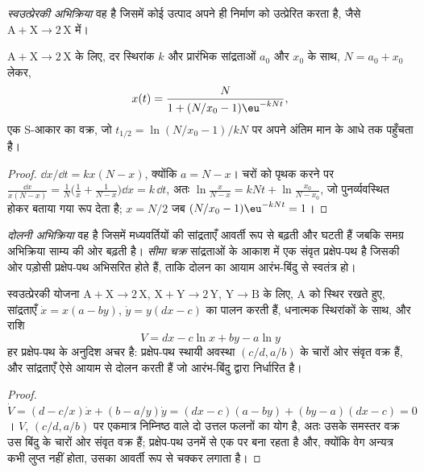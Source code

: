 \begin{definition}[स्वउत्प्रेरकी अभिक्रिया]\label{def:b3:complex-kinetics:autocatalysis}
\emph{स्वउत्प्रेरकी अभिक्रिया} वह है जिसमें कोई
उत्पाद अपने ही निर्माण को उत्प्रेरित करता है, जैसे $\mathrm{A + X \to 2\,X}$ में।
\end{definition}

\begin{proposition}[लॉजिस्टिक नियम]\label{prop:b3:complex-kinetics:logistic}
$\mathrm{A + X \to 2\,X}$ के लिए, दर स्थिरांक $k$ और प्रारंभिक सांद्रताओं $a_0$ और $x_0$ के साथ,
$N = a_0 + x_0$ लेकर,
\[
  x(t) = \frac{N}{1 + (N/x_0 - 1)\eu^{-kNt}},
\]
एक S-आकार का वक्र, जो $t_{1/2} = \ln(N/x_0 - 1)/kN$ पर अपने अंतिम मान के आधे तक पहुँचता है।
\end{proposition}

\begin{proof}
$\dd x/\dd t = kx(N - x)$, क्योंकि $a = N - x$। चरों को पृथक करने पर $\frac{\dd x}{x(N - x)} = \frac1N\bigl(\frac1x + \frac{1}{N - x}\bigr)\dd x
= k\,\dd t$, अतः $\ln\frac{x}{N - x} = kNt + \ln\frac{x_0}{N - x_0}$, जो पुनर्व्यवस्थित होकर बताया गया रूप देता है;
$x = N/2$ जब $(N/x_0 - 1)\eu^{-kNt} = 1$।
\end{proof}

\begin{definition}[दोलनी अभिक्रिया, सीमा चक्र]\label{def:b3:complex-kinetics:oscillating}
\emph{दोलनी अभिक्रिया} वह है जिसमें
मध्यवर्तियों की सांद्रताएँ आवर्ती रूप से बढ़ती और घटती हैं जबकि समग्र
अभिक्रिया साम्य की ओर बढ़ती है। \emph{सीमा चक्र}
सांद्रताओं के आकाश में एक संवृत प्रक्षेप-पथ है जिसकी ओर पड़ोसी
प्रक्षेप-पथ अभिसरित होते हैं, ताकि दोलन का आयाम
आरंभ-बिंदु से स्वतंत्र हो।
\end{definition}

\begin{theorem}[लोत्का--वोल्टेरा मॉडल]\label{thm:b3:complex-kinetics:lotka-volterra}
स्वउत्प्रेरकी योजना $\mathrm{A + X \to 2\,X}$, $\mathrm{X + Y \to 2\,Y}$, $\mathrm{Y \to B}$ के लिए, A को
स्थिर रखते हुए, सांद्रताएँ $\dot x = x(a - by)$, $\dot y = y(dx - c)$ का पालन करती हैं, धनात्मक
स्थिरांकों के साथ, और राशि
\[
  V = dx - c\ln x + by - a\ln y
\]
हर प्रक्षेप-पथ के अनुदिश अचर है: प्रक्षेप-पथ स्थायी अवस्था $(c/d, a/b)$ के
चारों ओर संवृत वक्र हैं, और सांद्रताएँ ऐसे
आयाम से दोलन करती हैं जो आरंभ-बिंदु द्वारा निर्धारित है।
\end{theorem}

\begin{proof}
$\dot V = (d - c/x)\dot x + (b - a/y)\dot y = (dx - c)(a - by) + (by - a)(dx - c) = 0$। $V$, $(c/d, a/b)$ पर
एकमात्र निम्निष्ठ वाले दो उत्तल फलनों का योग है, अतः उसके समस्तर
वक्र उस बिंदु के चारों ओर संवृत वक्र हैं; प्रक्षेप-पथ उनमें से एक पर बना रहता है
और, क्योंकि वेग अन्यत्र कभी लुप्त नहीं होता, उसका आवर्ती रूप से चक्कर लगाता है।
\end{proof}

